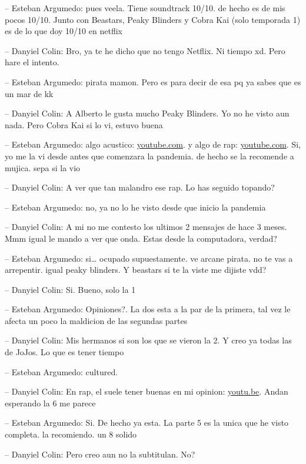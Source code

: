 -- Esteban Argumedo: pues veela. Tiene soundtrack 10/10. de hecho es de
mis pocos 10/10. Junto con Beastars, Peaky Blinders y Cobra Kai (solo
temporada 1) es de lo que doy 10/10 en netflix

-- Danyiel Colin: Bro, ya te he dicho que no tengo Netflix. Ni tiempo
xd. Pero hare el intento.

-- Esteban Argumedo: pirata mamon. Pero es para decir de esa pq ya sabes
que es un mar de kk

-- Danyiel Colin: A Alberto le gusta mucho Peaky Blinders. Yo no he
visto aun nada. Pero Cobra Kai si lo vi, estuvo buena

-- Esteban Argumedo: algo acustico:
\href{https://www.youtube.com/watch?v=kneybAZQP68\&list=PLqrrTT1Y5oWFNGfuBF18rdVwOFQTXObKt\&index=159}{youtube.com}.
y algo de rap:
\href{https://www.youtube.com/watch?v=nSezNDsJC1w\&list=PLqrrTT1Y5oWFNGfuBF18rdVwOFQTXObKt\&index=150}{youtube.com}.
Si, yo me la vi desde antes que comenzara la pandemia. de hecho se la
recomende a mujica. sepa si la vio

-- Danyiel Colin: A ver que tan malandro ese rap. Lo has seguido
topando?

-- Esteban Argumedo: no, ya no lo he visto desde que inicio la pandemia

-- Danyiel Colin: A mi no me contesto los ultimos 2 mensajes de hace 3
meses. Mmm igual le mando a ver que onda. Estas desde la computadora,
verdad?

-- Esteban Argumedo: si\ldots{} ocupado supuestamente. ve arcane pirata.
no te vas a arrepentir. igual peaky blinders. Y beastars si te la viste
me dijiste vdd?

-- Danyiel Colin: Si. Bueno, solo la 1

-- Esteban Argumedo: Opiniones?. La dos esta a la par de la primera, tal
vez le afecta un poco la maldicion de las segundas partes

-- Danyiel Colin: Mis hermanos si son los que se vieron la 2. Y creo ya
todas las de JoJos. Lo que es tener tiempo

-- Esteban Argumedo: cultured.

-- Danyiel Colin: En rap, el suele tener buenas en mi opinion:
\href{https://youtu.be/bHhSmwAlY88}{youtu.be}. Andan esperando la 6 me
parece

-- Esteban Argumedo: Si. De hecho ya esta. La parte 5 es la unica que he
visto completa. la recomiendo. un 8 solido

-- Danyiel Colin: Pero creo aun no la subtitulan. No?

